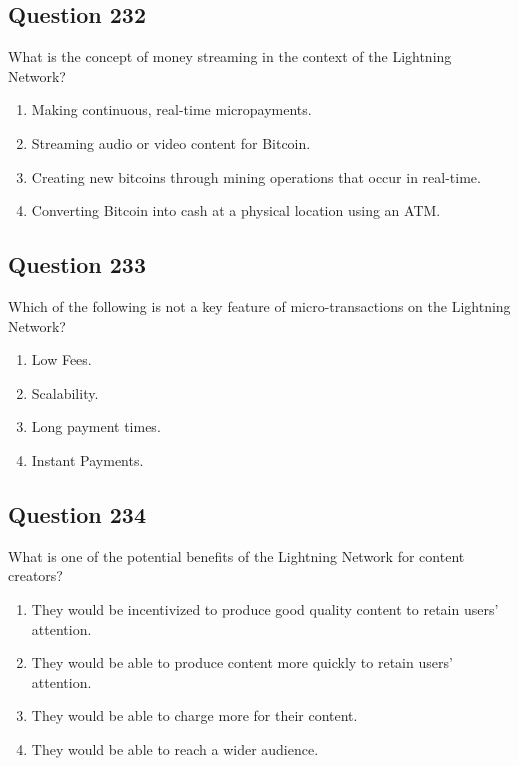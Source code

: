 \documentclass[12pt,a4paper]{article}
\begin{document}
\bigskip


\subsection*{Question 232}
What is the concept of money streaming in the context of the Lightning Network?

\begin{enumerate}[label=\Alph*., leftmargin=*]
\item Making continuous, real-time micropayments.
\item Streaming audio or video content for Bitcoin.
\item Creating new bitcoins through mining operations that occur in real-time.
\item Converting Bitcoin into cash at a physical location using an ATM.
\end{enumerate}

\bigskip


\subsection*{Question 233}
Which of the following is not a key feature of micro-transactions on the Lightning Network?

\begin{enumerate}[label=\Alph*., leftmargin=*]
\item Low Fees.
\item Scalability.
\item Long payment times.
\item Instant Payments.
\end{enumerate}

\bigskip


\subsection*{Question 234}
What is one of the potential benefits of the Lightning Network for content creators?

\begin{enumerate}[label=\Alph*., leftmargin=*]
\item They would be incentivized to produce good quality content to retain users' attention.
\item They would be able to produce content more quickly to retain users' attention.
\item They would be able to charge more for their content.
\item They would be able to reach a wider audience.
\end{enumerate}
\end{document}
